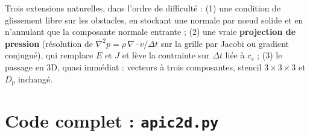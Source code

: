 \documentclass[11pt,a4paper]{article}
\begin{document}
Trois extensions naturelles, dans l'ordre de difficulté : (1) une condition de glissement
libre sur les obstacles, en stockant une normale par n\oe ud solide et en n'annulant que la
composante normale entrante ; (2) une vraie \textbf{projection de pression} (résolution de
$\nabla^2 p = \rho\,\nabla\cdot v / \Delta t$ sur la grille par Jacobi ou gradient conjugué),
qui remplace $E$ et $J$ et lève la contrainte sur $\Delta t$ liée à $c_s$ ; (3) le passage en 3D,
quasi immédiat : vecteurs à trois composantes, stencil $3\times3\times3$ et $D_p$ inchangé.

\appendix
\section{Code complet : \texttt{apic2d.py}}
\end{document}
